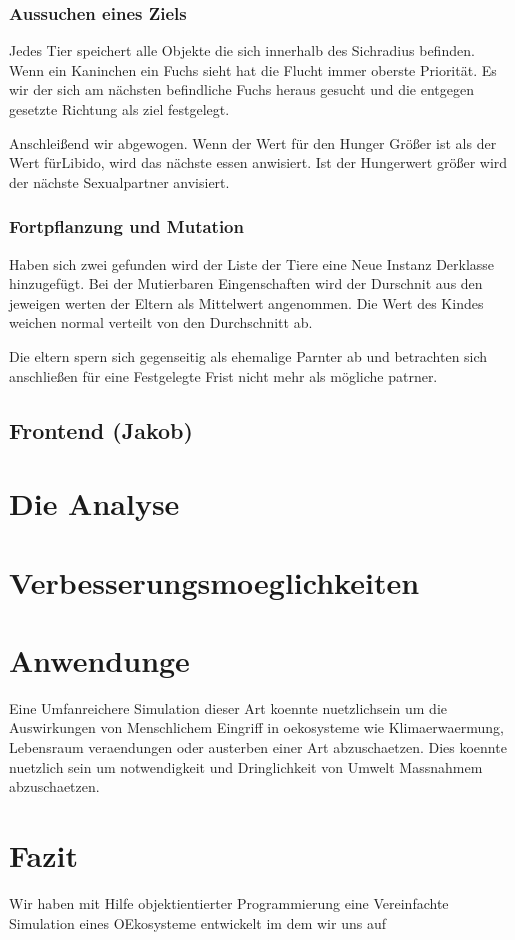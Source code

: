 \documentclass[12pt]{article}
\begin{document}
\subsubsection{Aussuchen eines Ziels}
Jedes Tier speichert alle Objekte die sich innerhalb des Sichradius befinden.
Wenn ein Kaninchen ein Fuchs sieht hat die Flucht immer oberste Priorität.
Es wir der sich am nächsten befindliche Fuchs heraus gesucht und die entgegen gesetzte Richtung als ziel festgelegt.

Anschleißend wir abgewogen.
Wenn der Wert für den Hunger Größer ist als der Wert fürLibido, wird das nächste essen anwisiert.
Ist der Hungerwert größer wird der nächste Sexualpartner anvisiert.
\subsubsection{Fortpflanzung und Mutation}
Haben sich zwei gefunden wird der Liste der Tiere eine Neue Instanz Derklasse hinzugefügt.
Bei der Mutierbaren Eingenschaften wird der Durschnit aus den jeweigen werten der Eltern als Mittelwert angenommen.
Die Wert des Kindes weichen normal verteilt von den Durchschnitt ab.

Die eltern spern sich gegenseitig als ehemalige Parnter ab und betrachten sich anschließen für eine Festgelegte Frist nicht mehr als mögliche patrner.

\subsection{Frontend (Jakob)}
\section{Die Analyse}
\section{Verbesserungsmoeglichkeiten}

\section{Anwendunge}
Eine Umfanreichere Simulation dieser Art koennte nuetzlichsein um die Auswirkungen von Menschlichem Eingriff in oekosysteme wie Klimaerwaermung, Lebensraum veraendungen oder austerben einer Art abzuschaetzen.
Dies koennte nuetzlich sein um notwendigkeit und Dringlichkeit von Umwelt Massnahmem abzuschaetzen.
\section{Fazit}
Wir haben mit Hilfe objektientierter Programmierung eine Vereinfachte Simulation eines OEkosysteme entwickelt im dem wir uns auf 
\end{document}
